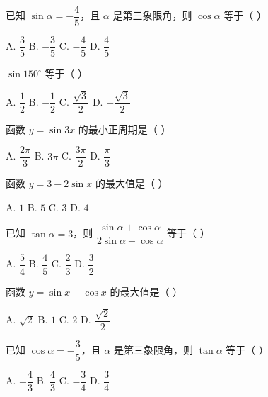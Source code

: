 \documentclass[11pt, a4paper]{article}
\begin{document}

\begin{baitap}[1]
已知 $\sin\alpha = -\dfrac{4}{5}$，且 $\alpha$ 是第三象限角，则 $\cos\alpha$ 等于（ ）
\par\vspace{3pt}
\noindent A. $\dfrac{3}{5}$ \quad B. $-\dfrac{3}{5}$ \quad C. $-\dfrac{4}{5}$ \quad D. $\dfrac{4}{5}$
\end{baitap}

\begin{baitap}[2]
$\sin 150^\circ$ 等于（ ）
\par\vspace{3pt}
\noindent A. $\dfrac{1}{2}$ \quad B. $-\dfrac{1}{2}$ \quad C. $\dfrac{\sqrt{3}}{2}$ \quad D. $-\dfrac{\sqrt{3}}{2}$
\end{baitap}

\begin{baitap}[3]
函数 $y = \sin 3x$ 的最小正周期是（ ）
\par\vspace{3pt}
\noindent A. $\dfrac{2\pi}{3}$ \quad B. $3\pi$ \quad C. $\dfrac{3\pi}{2}$ \quad D. $\dfrac{\pi}{3}$
\end{baitap}

\begin{baitap}[4]
函数 $y = 3 - 2\sin x$ 的最大值是（ ）
\par\vspace{3pt}
\noindent A. $1$ \quad B. $5$ \quad C. $3$ \quad D. $4$
\end{baitap}

\begin{baitap}[5]
已知 $\tan\alpha = 3$，则 $\dfrac{\sin\alpha + \cos\alpha}{2\sin\alpha - \cos\alpha}$ 等于（ ）
\par\vspace{3pt}
\noindent A. $\dfrac{5}{4}$ \quad B. $\dfrac{4}{5}$ \quad C. $\dfrac{2}{3}$ \quad D. $\dfrac{3}{2}$
\end{baitap}

\begin{baitap}[6]
函数 $y = \sin x + \cos x$ 的最大值是（ ）
\par\vspace{3pt}
\noindent A. $\sqrt{2}$ \quad B. $1$ \quad C. $2$ \quad D. $\dfrac{\sqrt{2}}{2}$
\end{baitap}

\begin{baitap}[7]
已知 $\cos\alpha = -\dfrac{3}{5}$，且 $\alpha$ 是第三象限角，则 $\tan\alpha$ 等于（ ）
\par\vspace{3pt}
\noindent A. $-\dfrac{4}{3}$ \quad B. $\dfrac{4}{3}$ \quad C. $-\dfrac{3}{4}$ \quad D. $\dfrac{3}{4}$
\end{baitap}
\end{document}
